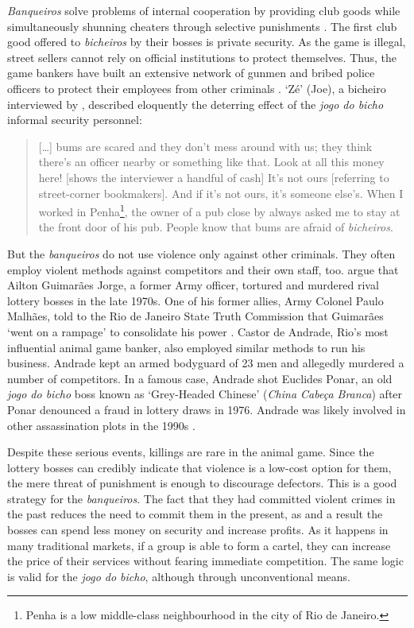 \documentclass[a4paper,12pt]{article}
\begin{document}
\textit{Banqueiros} solve problems of internal cooperation by providing club goods \citep{buchanan1965economic} while simultaneously shunning cheaters through selective punishments \citep{bo2005cooperation, roth1978equilibrium}. The first club good offered to \textit{bicheiros} by their bosses is private security. As the game is illegal, street sellers cannot rely on official institutions to protect themselves. Thus, the game bankers have built an extensive network of gunmen and bribed police officers to protect their employees from other criminals \citetext{\citealp[48]{chinelli1993vazio}; \citealp[51]{labronici2012paratodos}}. `Zé' (Joe), a bicheiro interviewed by \citet[52]{labronici2012paratodos}, described eloquently the deterring effect of the \textit{jogo do bicho} informal security personnel:

\begin{quote}
 [\dots] bums are scared and they don't mess around with us; they think there's an officer nearby or something like that. Look at all this money here! [shows the interviewer a handful of cash] It's not ours [referring to street-corner bookmakers]. And if it's not ours, it's someone else's. When I worked in Penha\footnote{Penha is a low middle-class neighbourhood in the city of Rio de Janeiro.}, the owner of a pub close by always asked me to stay at the front door of his pub. People know that bums are afraid of \textit{bicheiros}.
\end{quote}

But the \textit{banqueiros} do not use violence only against other criminals. They often employ violent methods against competitors and their own staff, too. \citet{jupiara2015poroes} argue that Ailton Guimarães Jorge, a former Army officer, tortured and murdered rival lottery bosses in the late 1970s. One of his former allies, Army Colonel Paulo Malhães, told to the Rio de Janeiro State Truth Commission that Guimarães `went on a rampage' to consolidate his power \citep{belem2015guimaraes}. Castor de Andrade, Rio's most influential animal game banker, also employed similar methods to run his business. Andrade kept an armed bodyguard of 23 men and allegedly murdered a number of competitors. In a famous case, Andrade shot Euclides Ponar, an old \textit{jogo do bicho} boss known as `Grey-Headed Chinese' (\textit{China Cabe\c{c}a Branca}) after Ponar denounced a fraud in lottery draws in 1976. Andrade was likely involved in other assassination plots in the 1990s  \citep{globo2017castor}. 

Despite these serious events, killings are rare in the animal game. Since the lottery bosses can credibly indicate that violence is a low-cost option for them, the mere threat of punishment is enough to discourage defectors. This is a good strategy for the \textit{banqueiros}. The fact that they had committed violent crimes in the past reduces the need to commit them in the present, as and a result the bosses can spend less money on security and increase profits. As it happens in many traditional markets, if a group is able to form a cartel, they can increase the price of their services without fearing immediate competition. The same logic is valid for the \textit{jogo do bicho}, although through unconventional means.  
\end{document}
